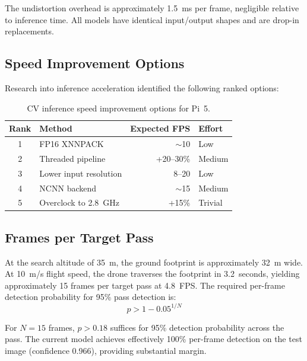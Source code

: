 The undistortion overhead is approximately 1.5~ms per frame, negligible relative
to inference time. All models have identical input/output shapes and are drop-in
replacements.

\subsection{Speed Improvement Options}

Research into inference acceleration identified the following ranked options:

\begin{table}[htbp]
\centering
\caption{CV inference speed improvement options for Pi~5.}
\label{tab:speed-options}
\begin{tabular}{clrl}
\hline
\textbf{Rank} & \textbf{Method} & \textbf{Expected FPS} & \textbf{Effort} \\
\hline
1 & FP16 XNNPACK          & $\sim$10 & Low \\
2 & Threaded pipeline      & +20--30\% & Medium \\
3 & Lower input resolution & 8--20    & Low \\
4 & NCNN backend           & $\sim$15 & Medium \\
5 & Overclock to 2.8~GHz   & +15\%    & Trivial \\
\hline
\end{tabular}
\end{table}

\subsection{Frames per Target Pass}

At the search altitude of 35~m, the ground footprint is approximately 32~m wide.
At 10~m/s flight speed, the drone traverses the footprint in 3.2~seconds, yielding
approximately 15 frames per target pass at 4.8~FPS. The required per-frame
detection probability for 95\% pass detection is:
\begin{equation}
    p > 1 - 0.05^{1/N}
    \label{eq:detection-probability}
\end{equation}

For $N = 15$ frames, $p > 0.18$ suffices for 95\% detection probability across
the pass. The current model achieves effectively 100\% per-frame detection on
the test image (confidence 0.966), providing substantial margin.


